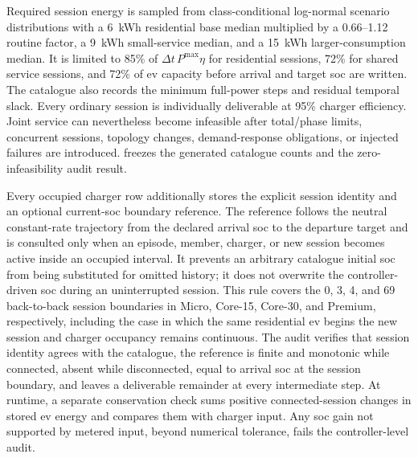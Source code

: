 Required session energy is sampled from class-conditional log-normal scenario distributions with a 6~kWh residential base median multiplied by a 0.66--1.12 routine factor, a 9~kWh small-service median, and a 15~kWh larger-consumption median. It is limited to 85\% of $\Delta t\,P^{\max}\eta$ for residential sessions, 72\% for shared service sessions, and 72\% of \gls{ev} capacity before arrival and target \gls{soc} are written. The catalogue also records the minimum full-power steps and residual temporal slack. Every ordinary session is individually deliverable at 95\% charger efficiency. Joint service can nevertheless become infeasible after total/phase limits, concurrent sessions, topology changes, demand-response obligations, or injected failures are introduced.  freezes the generated catalogue counts and the zero-infeasibility audit result.

Every occupied charger row additionally stores the explicit session identity and an optional current-\gls{soc} boundary reference. The reference follows the neutral constant-rate trajectory from the declared arrival \gls{soc} to the departure target and is consulted only when an episode, member, charger, or new session becomes active inside an occupied interval. It prevents an arbitrary catalogue initial \gls{soc} from being substituted for omitted history; it does not overwrite the controller-driven \gls{soc} during an uninterrupted session. This rule covers the 0, 3, 4, and 69 back-to-back session boundaries in Micro, Core-15, Core-30, and Premium, respectively, including the case in which the same residential \gls{ev} begins the new session and charger occupancy remains continuous. The audit verifies that session identity agrees with the catalogue, the reference is finite and monotonic while connected, absent while disconnected, equal to arrival \gls{soc} at the session boundary, and leaves a deliverable remainder at every intermediate step. At runtime, a separate conservation check sums positive connected-session changes in stored \gls{ev} energy and compares them with charger input. Any \gls{soc} gain not supported by metered input, beyond numerical tolerance, fails the controller-level audit.

